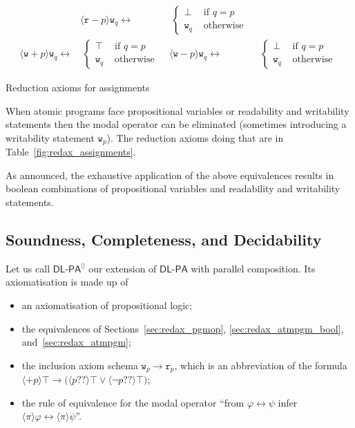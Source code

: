 \documentclass{llncs}
\newcommand{\pll}{ {||} }							%
\newcommand{\readable}[1]{\mathtt{r}_{#1}}
\newcommand{\writable}[1]{\mathtt{w}_{#1}}
\newcommand{\testendo}{?\!\!?}			%
\newcommand{\Dlpa}{\ensuremath{\mathsf{DL\text{-}PA}}\xspace}
\newcommand{\DlpaPll}{\ensuremath{\mathsf{DL\text{-}PA}^\pll}\xspace}
\newcommand{\assgnbotR}[1]{{\mathtt r {-} #1}}
\newcommand{\assgntopW}[1]{{\mathtt w {+} #1}}
\newcommand{\assgnbotW}[1]{{\mathtt w {-} #1}}
\newcommand{\assgntopV}[1]{{\mathtt {+} #1}}
\newcommand{\assgnbotV}[1]{{\mathtt {-} #1}}
\newcommand{\ldia}[1]{ \big\langle #1 \big\rangle}
\newcommand{\leqv}{ \leftrightarrow }
\newcommand{\limp}{ \rightarrow }
\renewcommand{\phi}{\varphi}
\begin{document}
\begin{table}[t]
\begin{align*}
& \ldia{\assgnbotR p } \writable{q} \leqv &\ \begin{cases}
                \bot & \text{ if } q = p \\
                \writable{q} & \text{ otherwise } 
								\end{cases}
\\
\ldia{\assgntopW p } \writable{q} \leqv &\ \begin{cases}
								\top & \text{ if } q = p \\
								\writable{q} & \text{ otherwise }
								\end{cases}
& \ldia{\assgnbotW p } \writable{q} \leqv &\ \begin{cases}
								\bot & \text{ if } q = p \\
								\writable{q} & \text{ otherwise }
								\end{cases}
\end{align*}
\caption{Reduction axioms for assignments
\label{fig:redax_assignments}
}
\end{table}

When atomic programs face propositional variables or readability and writability statements 
then the modal operator can be eliminated (sometimes introducing a writability statement $\writable{p}$). 
The reduction axioms doing that are in Table~\ref{fig:redax_assignments}.

As announced, the exhaustive application of the above equivalences results in boolean combinations of 
propositional variables and readability and writability statements. 

\subsection{Soundness, Completeness, and Decidability} 

Let us call \DlpaPll our extension of \Dlpa with parallel composition. 
Its axiomatisation is made up of 
\begin{itemize}
\item
an axiomatisation of propositional logic;
\item
the equivalences of Sections~\ref{sec:redax_pgmop}, 
\ref{sec:redax_atmpgm_bool}, 
and~\ref{sec:redax_atmpgm};
\item
the inclusion axiom schema $\writable{p} \limp \readable p$, which is an abbreviation of the formula
$\ldia{ \assgntopV p } \top \limp \big( \ldia{ p \testendo} \top \lor \ldia{ \lnot p \testendo} \top \big) $;
\item
the rule of equivalence for the modal operator %
``from $\phi \leqv \psi$ infer $\ldia \pi \phi \leqv \ldia \pi \psi $''.
\end{itemize}
\end{document}
